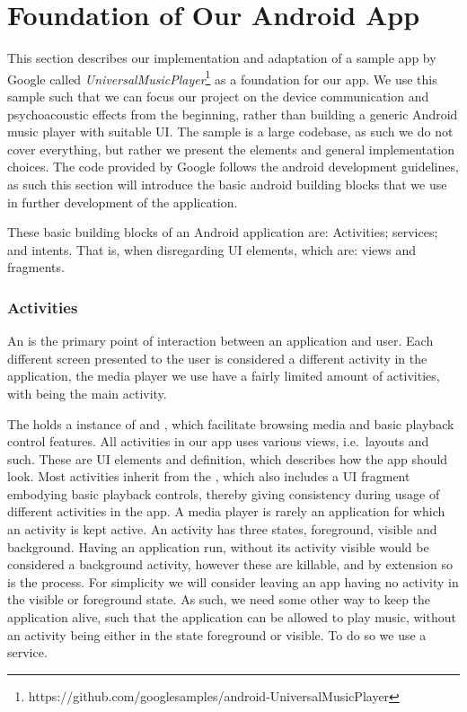 \section{Foundation of Our Android App}
This section describes our implementation and adaptation of a sample app by Google called \textit{UniversalMusicPlayer}\footnote{https://github.com/googlesamples/android-UniversalMusicPlayer} as a foundation for our app.
We use this sample such that we can focus our project on the device communication and psychoacoustic effects from the beginning, rather than building a generic Android music player with suitable \ac{UI}.
The sample is a large codebase, as such we do not cover everything, but rather we present the elements and general implementation choices.
The code provided by Google follows the android development guidelines, as such this section will introduce the basic android building blocks that we use in further development of the application.

These basic building blocks of an Android application are: Activities; services; and intents.
That is, when disregarding \ac{UI} elements, which are: views and fragments.

\subsubsection{Activities}
An  is the primary point of interaction between an application and user.
Each different screen presented to the user is considered a different activity in the application, the media player we use have a fairly limited amount of activities, with  being the main activity.

The  holds a instance of  and , which facilitate browsing media and basic playback control features.
All activities in our app uses various views, i.e.~layouts and such. These are \ac{UI} elements and definition, which describes how the app should look.
Most activities inherit from the , which also includes a \ac{UI} fragment embodying basic playback controls, thereby giving consistency during usage of different activities in the app.
A media player is rarely an application for which an activity is kept active.
An activity has three states, foreground, visible and background.
Having an application run, without its activity visible would be considered a background activity, however these are killable, and by extension so is the process.
For simplicity we will consider leaving an app having no activity in the visible or foreground state.
As such, we need some other way to keep the application alive, such that the application can be allowed to play music, without an activity being either in the state foreground or visible.
To do so we use a service.


